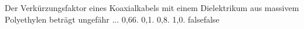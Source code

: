     {Der Verkürzungsfaktor eines Koaxialkabels mit einem Dielektrikum aus massivem Polyethylen beträgt ungefähr ...}
    {0,66.}
    {0,1.}
    {0,8.}
    {1,0.}
    {false}{false}